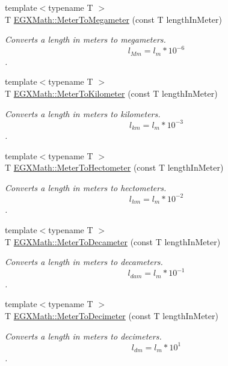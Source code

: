 \begin{DoxyCompactItemize}
{\footnotesize template$<$typename T $>$ }\\T \mbox{\hyperlink{group___e_g_x_math-_conversions-_length_conversions-_s_i-_meter-_s_i_ga738fd2590049b1c2ae6ef2ecad9ed7f9}{E\+G\+X\+Math\+::\+Meter\+To\+Megameter}} (const T length\+In\+Meter)
\begin{DoxyCompactList}\small\item\em Converts a length in meters to megameters. \[ l_{Mm}=l_{m} * 10^{-6} \]. \end{DoxyCompactList}\item 
{\footnotesize template$<$typename T $>$ }\\T \mbox{\hyperlink{group___e_g_x_math-_conversions-_length_conversions-_s_i-_meter-_s_i_ga31b34ce8172d5b2401deb27db4ed6ece}{E\+G\+X\+Math\+::\+Meter\+To\+Kilometer}} (const T length\+In\+Meter)
\begin{DoxyCompactList}\small\item\em Converts a length in meters to kilometers. \[ l_{km}=l_{m} * 10^{-3} \]. \end{DoxyCompactList}\item 
{\footnotesize template$<$typename T $>$ }\\T \mbox{\hyperlink{group___e_g_x_math-_conversions-_length_conversions-_s_i-_meter-_s_i_ga1de9cc8f2ecedbf82eacc869b0c0569c}{E\+G\+X\+Math\+::\+Meter\+To\+Hectometer}} (const T length\+In\+Meter)
\begin{DoxyCompactList}\small\item\em Converts a length in meters to hectometers. \[ l_{hm}=l_{m} * 10^{-2} \]. \end{DoxyCompactList}\item 
{\footnotesize template$<$typename T $>$ }\\T \mbox{\hyperlink{group___e_g_x_math-_conversions-_length_conversions-_s_i-_meter-_s_i_ga1b18e63d03025512566c5f55ad4e0c89}{E\+G\+X\+Math\+::\+Meter\+To\+Decameter}} (const T length\+In\+Meter)
\begin{DoxyCompactList}\small\item\em Converts a length in meters to decameters. \[ l_{dam}=l_{m} * 10^{-1} \]. \end{DoxyCompactList}\item 
{\footnotesize template$<$typename T $>$ }\\T \mbox{\hyperlink{group___e_g_x_math-_conversions-_length_conversions-_s_i-_meter-_s_i_ga4caa9cd21d4f78039b1ceddf1f0ea5fd}{E\+G\+X\+Math\+::\+Meter\+To\+Decimeter}} (const T length\+In\+Meter)
\begin{DoxyCompactList}\small\item\em Converts a length in meters to decimeters. \[ l_{dm}=l_{m} * 10^{1} \]. \end{DoxyCompactList}\item 

\end{DoxyCompactItemize}

